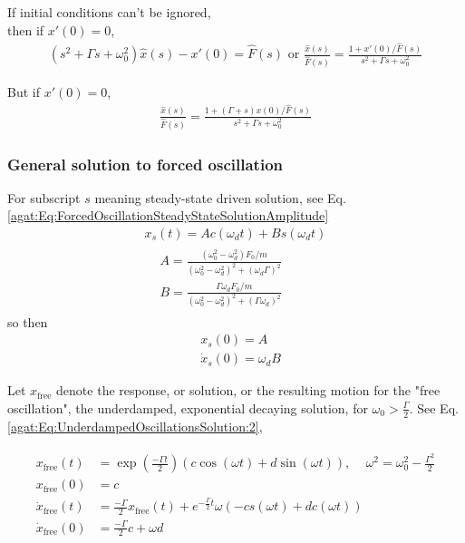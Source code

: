 If initial conditions can't be ignored, \\
then if $x'(0) =0$,
\[
\begin{gathered}
(s^2 + \Gamma s + \omega_0^2) \widehat{x}(s) - x'(0) = \widehat{F}(s) \text{ or } \frac{ \widehat{x}(s) }{ \widehat{F}(s) } = \frac{ 1 + x'(0) / \widehat{F}(s) }{ s^2 + \Gamma s + \omega_0^2 }
\end{gathered}
\]

But if $x'(0) =0$,
\[
\begin{gathered}
\frac{ \widehat{x}(s) }{ \widehat{F}(s) } = \frac{ 1 + (\Gamma +s )x(0) / \widehat{F}(s) }{ s^2 + \Gamma s + \omega_0^2 }
\end{gathered}
\]

\subsubsection{General solution to forced oscillation}

For subscript $s$ meaning steady-state driven solution, see Eq. \ref{agat:Eq:ForcedOscillationSteadyStateSolutionAmplitude}
\[
\begin{gathered}
x_s(t) = Ac(\omega_d t) + Bs(\omega_d t) \\
\begin{aligned}
& A = \frac{ (\omega_0^2 - \omega_d^2) F_0 / m }{ (\omega_0^2 - \omega_d^2)^2 + (\omega_d \Gamma)^2 } \\
& B = \frac{ \Gamma \omega_d F_0 / m }{ (\omega_0^2 - \omega_d^2)^2 + (\Gamma \omega_d)^2 }
\end{aligned}
\end{gathered}
\] 
so then
\[
\begin{aligned}
& x_s(0) = A \\
& \dot{x}_s(0) = \omega_dB
\end{aligned}
\]

Let $x_{\text{free}}$ denote the response, or solution, or the resulting motion for the "free oscillation", the underdamped, exponential decaying solution, for $\omega_0 > \frac{\Gamma}{2}$. See Eq. \ref{agat:Eq:UnderdampedOscillationsSolution:2},

\[
\begin{gathered}
\begin{aligned}
x_{\text{free}}(t) & = \exp{ \left( \frac{-\Gamma t}{2} \right) } (c\cos{(\omega t)} + d\sin{ (\omega t)} ), \quad \, \omega^2 = \omega_0^2 -\frac{\Gamma^2}{2} \\
x_{\text{free}}(0) &= c \\
\dot{x}_{\text{free}}(t) & = \frac{-\Gamma}{2} x_{\text{free}}(t) + e^{-\frac{\Gamma}{2} t} \omega( - cs(\omega t) + dc(\omega t) ) \\
\dot{x}_{\text{free}}(0) & = \frac{-\Gamma}{2} c + \omega d
\end{aligned}
\end{gathered}
\]

